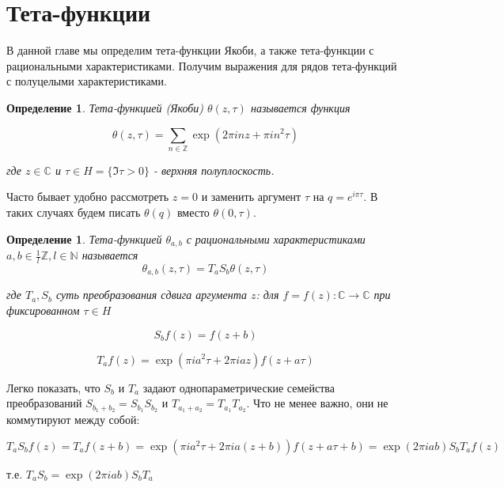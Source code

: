 \documentclass{article}
\newcommand{\ZZ}{\mathbb{Z}}
\newcommand{\CC}{\mathbb{C}}
\newcommand{\NN}{\mathbb{N}}
\theoremstyle{break}
\newtheorem{definition}[theorem]{Определение}
\begin{document}
\section{Тета-функции}
В данной главе мы определим тета-функции Якоби, а также тета-функции с рациональными характеристиками. Получим выражения для рядов тета-функций с полуцелыми характеристиками.
\begin{definition}
	Тета-функцией (Якоби) $\theta(z, \tau)$ называется функция
	
	\begin{equation}
	\theta(z,\tau)=\sum_{n \in \ZZ} \exp(2 \pi inz + \pi i n^2 \tau)
	\end{equation}
	
	
	где $z \in \CC$ и $\tau \in H=\{\Im \tau > 0\}$ - верхняя полуплоскость.
\end{definition}

Часто бывает удобно рассмотреть $z=0$ и заменить аргумент $\tau$ на $q=e^{i \pi \tau}$. 
В таких случаях будем писать $\theta(q)$ вместо $\theta(0, \tau)$.

\begin{definition}
Тета-функцией $\theta_{a, b}$ с рациональными характеристиками $a, b \in  \frac{1}{l}\ZZ, l \in \NN$ называется
\begin{equation}
	\theta_{a, b}(z, \tau)=T_aS_b\theta(z, \tau)
\end{equation}

где $T_a, S_b$ суть преобразования сдвига аргумента $z$: для $f=f(z): \CC \to \CC$ при фиксированном $\tau \in H$
\end{definition}
\begin{equation}
	S_b f(z)=f(z+b)
\end{equation}

\begin{equation}
	T_a f(z)=\exp{(\pi i a^2 \tau + 2 \pi i a z)}f(z + a\tau)
\end{equation}

Легко показать, что $S_b$ и $T_a$ задают однопараметрические семейства преобразований $S_{b_1 + b_2}=S_{b_1}S_{b_2}$ и $T_{a_1+a_2}=T_{a_1}T_{a_2}$. 
Что не менее важно, они не коммутируют между собой: 

\begin{equation}
T_a S_b f(z)=T_a f(z + b) = \exp{(\pi i a^2 \tau + 2 \pi i a (z + b))} f(z + a\tau + b) = \exp{(2 \pi i a b)} S_b T_a f(z)
\end{equation}

т.е. $T_a S_b = \exp(2 \pi i a b) S_b T_a$
\end{document}
